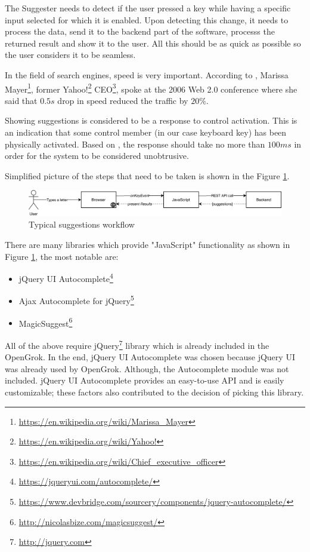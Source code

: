The Suggester needs to detect if the user pressed a key while having a specific input selected for which it is enabled. Upon
detecting this change, it needs to process the data, send it to the backend part of the software, processs the returned
result and show it to
the user. All this should be as quick as possible so the user considers it to be seamless.

In the field of search engines, speed is very important. According to \citep{marissa_mayers},
Marissa Mayer\footnote{\url{https://en.wikipedia.org/wiki/Marissa\_Mayer}}, former
Yahoo!\footnote{\url{https://en.wikipedia.org/wiki/Yahoo!}}
CEO\footnote{\url{https://en.wikipedia.org/wiki/Chief_executive_officer}}, spoke at the
2006 Web 2.0 conference where she said that $0.5s$ drop in speed reduced the traffic by $20\%$.

Showing suggestions is considered to be a response to control activation. This is an indication that some control member
(in our case keyboard key) has been physically activated. Based on \citep{response_time}, the response
should take no more than $100ms$ in order for the system to be considered unobtrusive.

Simplified picture of the
steps that need to be taken is shown in the Figure \ref{suggest_sequence}.

\begin{figure}[htbp]
\centering
\includegraphics[width=145mm]{../img/opengrok_sequence.pdf}
\caption{Typical suggestions workflow}
\label{suggest_sequence}
\end{figure}

There are many libraries which provide "JavaScript" functionality as shown in Figure \ref{suggest_sequence},
the most notable are:
\begin{itemize}
    \item jQuery UI Autocomplete\footnote{\url{https://jqueryui.com/autocomplete/}}
    \item Ajax Autocomplete for jQuery\footnote{\url{https://www.devbridge.com/sourcery/components/jquery-autocomplete/}}
    \item MagicSuggest\footnote{\url{http://nicolasbize.com/magicsuggest/}}
\end{itemize}

All of the above require jQuery\footnote{\url{http://jquery.com}} library which is already included in the OpenGrok.
In the end, jQuery UI Autocomplete was chosen because jQuery UI was already used by OpenGrok. Although, the Autocomplete
module was not included. jQuery UI Autocomplete provides an easy-to-use API and is easily customizable; these factors
also contributed to the decision of picking this library.

